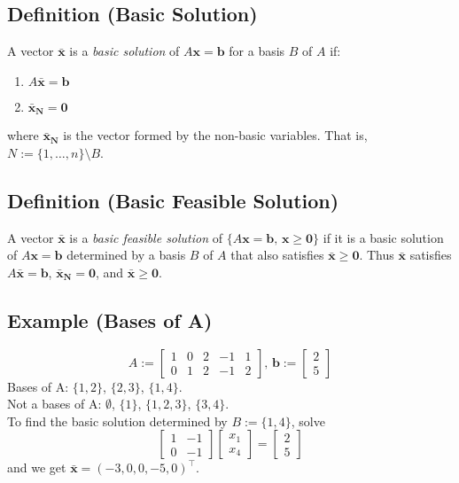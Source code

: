 \begin{defbox}
    \subsection{Definition (Basic Solution)}
    A vector $\bm{\bar{x}}$ is a \emph{basic solution} of $ A \bm{x}=\bm{b} $
    for a basis $ B $ of $ A $ if:
    \begin{enumerate}[(1)]
        \item $A \bm{\bar{x}}=\bm{b}$
        \item $\bm{\bar{x}_N}=\bm{0}$
    \end{enumerate}
    where $ \bm{\bar{x}_N} $ is the vector formed by the non-basic variables.
    That is, $ N:=\{1,\ldots,n\}\setminus B $.
\end{defbox}

\begin{defbox}
    \subsection{Definition (Basic Feasible Solution)}
    A vector $\bm{\bar{x}}$ is a \emph{basic feasible solution} of 
    $ \{A \bm{x}=\bm{b},\, \bm{x}\ge \bm{0}\} $ if it is a basic solution
    of $ A\bm{x}=\bm{b}$ determined by a basis $ B $ of $ A $ that also
    satisfies $\bm{\bar{x}}\ge \bm{0}$. Thus $ \bm{\bar{x}} $ satisfies
    $ A \bm{\bar{x}}=\bm{b} $, $ \bm{\bar{x}_N}=\bm{0} $, and $ \bm{\bar{x}}\ge \bm{0} $.
\end{defbox}

\subsection{Example (Bases of A)}
\[A:=
\begin{bmatrix}
    1 & 0 & 2 & -1 & 1\\
    0 & 1 & 2 & -1 & 2
\end{bmatrix}
\text{, }
\bm{b}:=
\begin{bmatrix}
    2\\
    5
\end{bmatrix}
\]
Bases of A: $\{1,2\}$, $\{2,3\}$, $\{1,4\}$.\\
Not a bases of A: $\emptyset$, $\{1\}$, $\{1,2,3\}$, $\{3,4\}$.\\
To find the basic solution determined by $B:=\{1,4\}$, solve
\[
\begin{bmatrix}
    1 & -1\\
    0 & -1
\end{bmatrix}
\begin{bmatrix}
    x_1\\
    x_4
\end{bmatrix}
=
\begin{bmatrix}
    2\\
    5
\end{bmatrix}
\]
and we get $\bm{\bar{x}}=(-3,0,0,-5,0)^\top $.